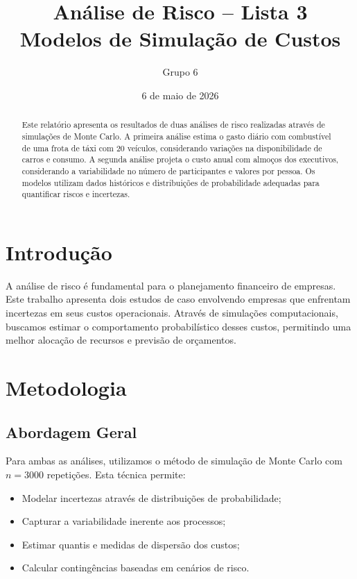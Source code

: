 \documentclass[12pt,a4paper]{article}
\title{\Large \textbf{Análise de Risco -- Lista 3} \\
       \large Modelos de Simulação de Custos}
\author{Grupo 6}
\date{6 de maio de 2026}
\begin{document}
\maketitle

\begin{abstract}
Este relatório apresenta os resultados de duas análises de risco realizadas através de simulações de Monte Carlo. A primeira análise estima o gasto diário com combustível de uma frota de táxi com 20 veículos, considerando variações na disponibilidade de carros e consumo. A segunda análise projeta o custo anual com almoços dos executivos, considerando a variabilidade no número de participantes e valores por pessoa. Os modelos utilizam dados históricos e distribuições de probabilidade adequadas para quantificar riscos e incertezas.
\end{abstract}

\section{Introdução}

A análise de risco é fundamental para o planejamento financeiro de empresas. Este trabalho apresenta dois estudos de caso envolvendo empresas que enfrentam incertezas em seus custos operacionais. Através de simulações computacionais, buscamos estimar o comportamento probabilístico desses custos, permitindo uma melhor alocação de recursos e previsão de orçamentos.

\section{Metodologia}

\subsection{Abordagem Geral}

Para ambas as análises, utilizamos o método de simulação de Monte Carlo com $n = 3000$ repetições. Esta técnica permite:

\begin{itemize}
    \item Modelar incertezas através de distribuições de probabilidade;
    \item Capturar a variabilidade inerente aos processos;
    \item Estimar quantis e medidas de dispersão dos custos;
    \item Calcular contingências baseadas em cenários de risco.
\end{itemize}
\end{document}
